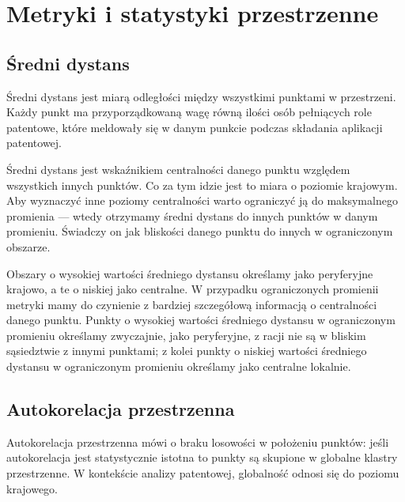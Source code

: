   \section{Metryki i statystyki przestrzenne}


\subsection{Średni dystans}

Średni dystans jest miarą odległości między wszystkimi punktami w przestrzeni.
Każdy punkt ma przyporządkowaną wagę równą ilości osób pełniących role patentowe,
które meldowały się w danym punkcie podczas składania aplikacji patentowej.


Średni dystans jest wskaźnikiem centralności danego punktu względem
wszystkich innych punktów. Co za tym idzie jest to miara o poziomie krajowym.
Aby wyznaczyć inne poziomy centralności warto ograniczyć ją do maksymalnego
promienia --- wtedy otrzymamy średni dystans do innych punktów w danym promieniu.
Świadczy on jak bliskości danego punktu do innych w ograniczonym obszarze.

Obszary o wysokiej wartości średniego dystansu określamy jako peryferyjne krajowo,
a te o niskiej jako centralne. W przypadku ograniczonych promienii metryki mamy
do czynienie z bardziej szczegółową informacją o centralności danego punktu.
Punkty o wysokiej wartości średniego dystansu w ograniczonym promieniu określamy
zwyczajnie, jako peryferyjne, z racji nie są w bliskim sąsiedztwie z innymi punktami;
z kolei punkty o niskiej wartości średniego dystansu w ograniczonym promieniu
określamy jako centralne lokalnie.



\subsection{Autokorelacja przestrzenna}

Autokorelacja przestrzenna mówi o braku losowości w położeniu punktów:
jeśli autokorelacja jest statystycznie istotna to punkty są skupione w 
globalne klastry przestrzenne\cite{Se-Ar-Da-Wo-20}.
W kontekście analizy patentowej, globalność odnosi się do poziomu krajowego.

